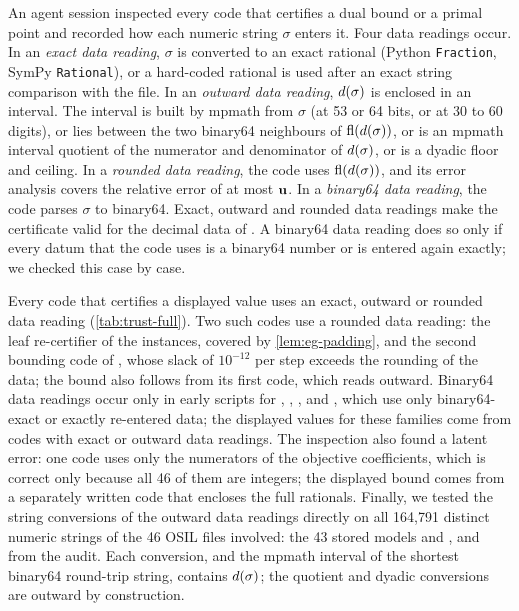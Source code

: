 An agent session inspected every code that certifies a dual bound or a primal point and recorded how each numeric string $\sigma$ enters it.
Four data readings occur.
In an \emph{exact data reading}, $\sigma$ is converted to an exact rational (Python \texttt{Fraction}, SymPy \texttt{Rational}), or a hard-coded rational is used after an exact string comparison with the file.
In an \emph{outward data reading}, $d(\sigma)$ is enclosed in an interval.
The interval is built by mpmath from $\sigma$ (at 53 or 64 bits, or at 30 to 60 digits), or lies between the two binary64 neighbours of $\operatorname{fl}(d(\sigma))$, or is an mpmath interval quotient of the numerator and denominator of $d(\sigma)$, or is a dyadic floor and ceiling.
In a \emph{rounded data reading}, the code uses $\operatorname{fl}(d(\sigma))$, and its error analysis covers the relative error of at most $\mathbf{u}$.
In a \emph{binary64 data reading}, the code parses $\sigma$ to binary64.
Exact, outward and rounded data readings make the certificate valid for the decimal data of .
A binary64 data reading does so only if every datum that the code uses is a binary64 number or is entered again exactly; we checked this case by case.

Every code that certifies a displayed value uses an exact, outward or rounded data reading (\cref{tab:trust-full}).
Two such codes use a rounded data reading: the leaf re-certifier of the  instances, covered by \cref{lem:eg-padding}, and the second bounding code of , whose slack of $10^{-12}$ per step exceeds the rounding of the data; the  bound also follows from its first code, which reads outward.
Binary64 data readings occur only in early scripts for , , ,  and , which use only binary64-exact or exactly re-entered data; the displayed values for these families come from codes with exact or outward data readings.
The inspection also found a latent error: one  code uses only the numerators of the objective coefficients, which is correct only because all 46 of them are integers; the displayed bound comes from a separately written code that encloses the full rationals.
Finally, we tested the string conversions of the outward data readings directly on all 164,791 distinct numeric strings of the 46 OSIL files involved: the 43 stored models and ,  and  from the audit.
Each conversion, and the mpmath interval of the shortest binary64 round-trip string, contains $d(\sigma)$; the quotient and dyadic conversions are outward by construction.

